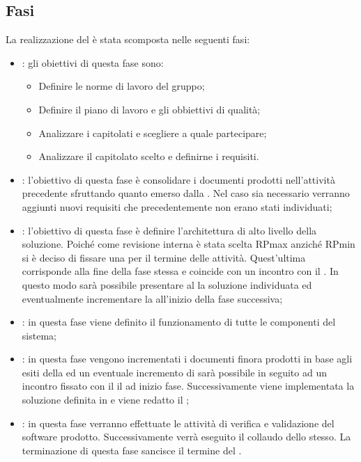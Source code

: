 \subsection{Fasi}\label{divisioneFasi}
La realizzazione del  è stata scomposta nelle seguenti fasi:
\begin{itemize}
\item \fA: gli obiettivi di questa fase sono:
\begin{itemize}
\item Definire le norme di lavoro del gruppo;
\item Definire il piano di lavoro e gli obbiettivi di qualità;
\item Analizzare i capitolati e scegliere a quale partecipare;
\item Analizzare il capitolato scelto e definirne i requisiti.
\end{itemize}
\item \fAD: l'obiettivo di questa fase è consolidare i documenti prodotti nell'attività precedente sfruttando quanto emerso dalla \RR. Nel caso sia necessario verranno aggiunti nuovi requisiti che precedentemente non erano stati individuati;
\item \fPA: l'obiettivo di questa fase è definire l'architettura di alto livello della soluzione. Poiché come revisione interna è stata scelta RPmax anziché RPmin si è deciso di fissare una  per il termine delle attività. Quest'ultima corrisponde alla fine della fase stessa e coincide con un incontro con il . In questo modo sarà possibile presentare al  la soluzione individuata ed eventualmente incrementare la \ST all'inizio della fase successiva;
\item \fPD: in questa fase viene definito il funzionamento di tutte le componenti del sistema;
\item \fC: in questa fase vengono incrementati i documenti finora prodotti in base agli esiti della \RP ed un eventuale incremento di \DP sarà possibile in seguito ad un incontro fissato con il il  ad inizio fase. Successivamente viene implementata la soluzione definita in \DP e viene redatto il \MU;
\item \fVV: in questa fase verranno effettuate le attività di verifica e validazione del software prodotto. Successivamente verrà eseguito il collaudo dello stesso. La terminazione di questa fase sancisce il termine del .
\end{itemize}
